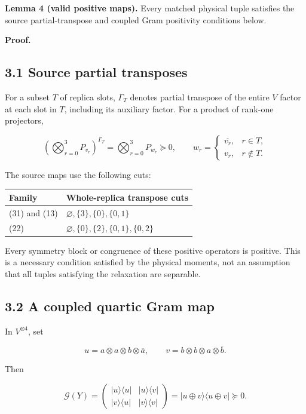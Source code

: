 \documentclass[
  11pt,
]{article}
\newcounter{none} %
\begin{document}
\textbf{Lemma 4 (valid positive maps).} Every matched physical tuple
satisfies the source partial-transpose and coupled Gram positivity
conditions below.

\textbf{Proof.}

\subsection{3.1 Source partial
transposes}\label{source-partial-transposes}

For a subset \(T\) of replica slots, \(\Gamma_T\) denotes partial
transpose of the entire \(V\) factor at each slot in \(T\), including
its auxiliary factor. For a product of rank-one projectors,

\[
\left(\bigotimes_{r=0}^3P_{v_r}\right)^{\Gamma_T}
=\bigotimes_{r=0}^3 P_{w_r}\succeq0,\qquad
w_r=\begin{cases}\overline{v_r},&r\in T,\\v_r,&r\notin T.\end{cases}
\tag{16}
\]

The source maps use the following cuts:

{\def\LTcaptype{none} %
\begin{longtable}[]{@{}ll@{}}
\toprule\noalign{}
Family & Whole-replica transpose cuts \\
\midrule\noalign{}
\endhead
\bottomrule\noalign{}
\endlastfoot
(31) and (13) & \(\varnothing,\{3\},\{0\},\{0,1\}\) \\
(22) & \(\varnothing,\{0\},\{2\},\{0,1\},\{0,2\}\) \\
\end{longtable}
}

Every symmetry block or congruence of these positive operators is
positive. This is a necessary condition satisfied by the physical
moments, not an assumption that all tuples satisfying the relaxation are
separable.

\subsection{3.2 A coupled quartic Gram
map}\label{a-coupled-quartic-gram-map}

In \(V^{\otimes4}\), set

\[
u=a\otimes a\otimes b\otimes\overline a,\qquad
v=b\otimes b\otimes a\otimes\overline b.
\]

Then

\[
\mathcal G(Y)=
\begin{pmatrix}|u\rangle\langle u|&|u\rangle\langle v|\\
|v\rangle\langle u|&|v\rangle\langle v|\end{pmatrix}
=|u\oplus v\rangle\langle u\oplus v|\succeq0.
\tag{17}
\]
\end{document}
